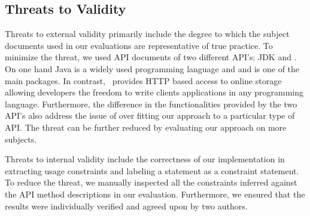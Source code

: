 \subsection{Threats to Validity}
\label{sub:threats_to_validity}
Threats to external validity primarily include the degree to which the subject documents used in our evaluations are representative of true practice. To minimize the threat, we used API documents of two different API's: JDK  and \amazon. On one hand Java is a widely used programming language and  and is one of the main packages. In contrast, \amazon\ provides HTTP based access to online storage allowing developers the freedom to write clients applications in any programming language. Furthermore, the difference in the functionalities provided by the two API's also address the issue of over fitting our approach to a particular type of API. The threat can be further reduced by evaluating our approach on more subjects. 

Threats to internal validity include the correctness of our implementation in extracting usage constraints and labeling a statement as a constraint statement. To reduce the threat, we manually inspected all the constraints inferred against the API method descriptions in our evaluation. Furthermore, we ensured that the results were individually verified and agreed upon by two authors.




